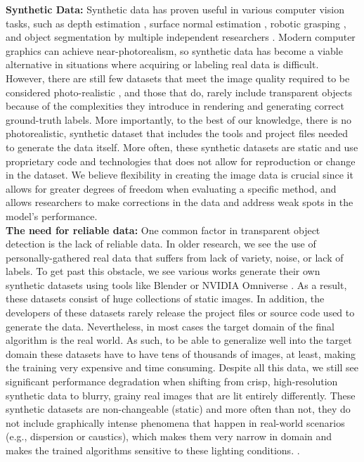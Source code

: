 \documentclass[conference]{IEEEtran}
\begin{document}
\noindent \textbf{Synthetic Data: } Synthetic data has proven useful in various computer vision tasks, such as depth estimation \cite{soccer,cleargrasp}, surface normal estimation \cite{AIP,cleargrasp}, robotic grasping \cite{dexnet}, and object segmentation \cite{model-driven-sim} by multiple independent researchers \cite{Photorealism2,model-driven-sim,photorealism3,AIP}. Modern computer graphics can achieve near-photorealism, so synthetic data has become a viable alternative in situations where acquiring or labeling real data is difficult. However, there are still few datasets that meet the image quality required to be considered photo-realistic \cite{LocalImplicit}, and those that do, rarely include transparent objects because of the complexities they introduce in rendering and generating correct ground-truth labels. More importantly, to the best of our knowledge, there is no photorealistic, synthetic dataset that includes the tools and project files needed to generate the data itself. More often, these synthetic datasets are static and use proprietary code and technologies that does not allow for reproduction or change in the dataset. We believe flexibility in creating the image data is crucial since it allows for greater degrees of freedom when evaluating a specific method, and allows researchers to make corrections in the data and address weak spots in the model's performance.\\





\noindent \textbf{The need for reliable data:} One common factor in transparent object detection is the lack of reliable data. In older research, we see the use of personally-gathered real data that suffers from lack of variety, noise, or lack of labels. To get past this obstacle, we see various works generate their own synthetic datasets using tools like Blender \cite{cleargrasp,blender} or NVIDIA Omniverse \cite{LocalImplicit,OmniVerse}. As a result, these datasets consist of huge collections of static images. In addition, the developers of these datasets rarely release the project files or source code used to generate the data. Nevertheless, in most cases the target domain of the final algorithm is the real world. As such, to be able to generalize well into the target domain these datasets have to have tens of thousands of images, at least, making the training very expensive and time consuming. Despite all this data, we still see significant performance degradation when shifting from crisp, high-resolution synthetic data to blurry, grainy real images that are lit entirely differently. These synthetic datasets are non-changeable (static) and more often than not, they do not include graphically intense phenomena that happen in real-world scenarios (e.g., dispersion or caustics), which makes them very narrow in domain and makes the trained algorithms sensitive to these lighting conditions. \cite{LocalImplicit, cleargrasp}.\\
\end{document}
